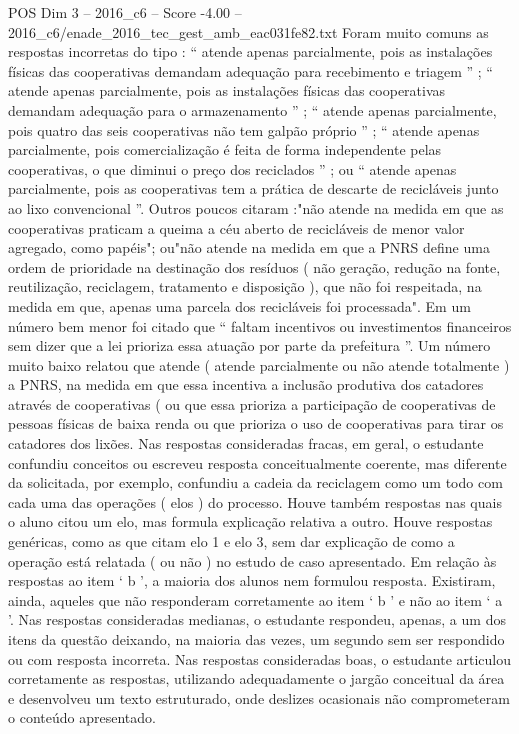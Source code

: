 \begin{textsample}{POS Dim 3 – 2016\_c6 – Score -4.00 – 2016\_c6/enade\_2016\_tec\_gest\_amb\_eac031fe82.txt}
Foram muito comuns as respostas incorretas do tipo : “ atende apenas parcialmente, pois as instalações físicas das cooperativas demandam adequação para recebimento e triagem ” ; “ atende apenas parcialmente, pois as instalações físicas das cooperativas demandam adequação para o armazenamento ” ; “ atende apenas parcialmente, pois quatro das seis cooperativas não tem galpão próprio ” ; “ atende apenas parcialmente, pois comercialização é feita de forma independente pelas cooperativas, o que diminui o preço dos reciclados ” ; ou “ atende apenas parcialmente, pois as cooperativas tem a prática de descarte de recicláveis junto ao lixo convencional ”.
Outros poucos citaram :"não atende na medida em que as cooperativas praticam a queima a céu aberto de recicláveis de menor valor agregado, como papéis"; ou"não atende na medida em que a PNRS define uma ordem de prioridade na destinação dos resíduos ( não geração, redução na fonte, reutilização, reciclagem, tratamento e disposição ), que não foi respeitada, na medida em que, apenas uma parcela dos recicláveis foi processada".
Em um número bem menor foi citado que “ faltam incentivos ou investimentos financeiros sem dizer que a lei prioriza essa atuação por parte da prefeitura ”.
Um número muito baixo relatou que atende ( atende parcialmente ou não atende totalmente ) a PNRS, na medida em que essa incentiva a inclusão produtiva dos catadores através de cooperativas ( ou que essa prioriza a participação de cooperativas de pessoas físicas de baixa renda ou que prioriza o uso de cooperativas para tirar os catadores dos lixões.
Nas respostas consideradas fracas, em geral, o estudante confundiu conceitos ou escreveu resposta conceitualmente coerente, mas diferente da solicitada, por exemplo, confundiu a cadeia da reciclagem como um todo com cada uma das operações ( elos ) do processo.
Houve também respostas nas quais o aluno citou um elo, mas formula explicação relativa a outro.
Houve respostas genéricas, como as que citam elo 1 e elo 3, sem dar explicação de como a operação está relatada ( ou não ) no estudo de caso apresentado.
Em relação às respostas ao item ‘ b ’, a maioria dos alunos nem formulou resposta.
Existiram, ainda, aqueles que não responderam corretamente ao item ‘ b ’ e não ao item ‘ a ’.
Nas respostas consideradas medianas, o estudante respondeu, apenas, a um dos itens da questão deixando, na maioria das vezes, um segundo sem ser respondido ou com resposta incorreta.
Nas respostas consideradas boas, o estudante articulou corretamente as respostas, utilizando adequadamente o jargão conceitual da área e desenvolveu um texto estruturado, onde deslizes ocasionais não comprometeram o conteúdo apresentado.

\end{textsample}
